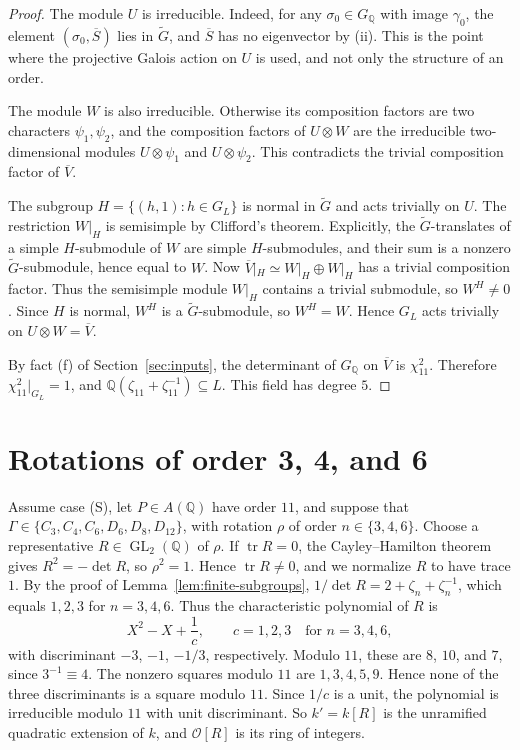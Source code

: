 \documentclass[11pt]{article}
\theoremstyle{remark}
\newcommand{\Q}{\mathbb Q}
\DeclareMathOperator{\GL}{GL}
\begin{document}
\begin{proof}
The module \(U\) is irreducible. Indeed, for any \(\sigma_0\in G_{\Q}\)
with image \(\gamma_0\), the element \((\sigma_0,\overline S)\) lies in
\(\widetilde G\), and \(\overline S\) has no eigenvector by (ii). This
is the point where the projective Galois action on \(U\) is used, and
not only the structure of an order.

The module \(W\) is also irreducible. Otherwise its composition factors
are two characters \(\psi_1,\psi_2\), and the composition factors of
\(U\otimes W\) are the irreducible two-dimensional modules
\(U\otimes\psi_1\) and \(U\otimes\psi_2\). This contradicts the trivial
composition factor of \(\overline V\).

The subgroup \(H=\{(h,1):h\in G_L\}\) is normal in \(\widetilde G\) and
acts trivially on \(U\). The restriction \(W|_H\) is semisimple by
Clifford's theorem. Explicitly, the \(\widetilde G\)-translates of a
simple \(H\)-submodule of \(W\) are simple \(H\)-submodules, and their
sum is a nonzero \(\widetilde G\)-submodule, hence equal to \(W\). Now
\(\overline V|_H\simeq W|_H\oplus W|_H\) has a trivial composition
factor. Thus the semisimple module \(W|_H\) contains a trivial
submodule, so \(W^H\neq0\). Since \(H\) is normal, \(W^H\) is a
\(\widetilde G\)-submodule, so \(W^H=W\). Hence \(G_L\) acts trivially
on \(U\otimes W=\overline V\).

By fact (f) of Section~\ref{sec:inputs}, the determinant of
\(G_{\Q}\) on \(\overline V\) is \(\chi_{11}^2\). Therefore
\(\chi_{11}^2|_{G_L}=1\), and
\(\Q(\zeta_{11}+\zeta_{11}^{-1})\subseteq L\). This field has degree
\(5\).
\end{proof}

\section{Rotations of order 3, 4, and 6}\label{sec:rotations}

Assume case (S), let \(P\in A(\Q)\) have order \(11\), and suppose
that \(\Gamma\in\{C_3,C_4,C_6,D_6,D_8,D_{12}\}\), with rotation
\(\rho\) of order \(n\in\{3,4,6\}\). Choose a representative
\(R\in\GL_2(\Q)\) of \(\rho\). If \(\operatorname{tr}R=0\), the
Cayley--Hamilton theorem gives \(R^2=-\det R\), so \(\rho^2=1\).
Hence \(\operatorname{tr}R\neq0\), and we normalize \(R\) to have trace
\(1\). By the proof of Lemma~\ref{lem:finite-subgroups},
\(1/\det R=2+\zeta_n+\zeta_n^{-1}\), which equals \(1,2,3\) for
\(n=3,4,6\). Thus the characteristic polynomial of \(R\) is
\[
 X^2-X+\frac1c,\qquad c=1,2,3\quad\text{for }n=3,4,6,
\]
with discriminant \(-3\), \(-1\), \(-1/3\), respectively. Modulo
\(11\), these are \(8\), \(10\), and \(7\), since \(3^{-1}\equiv4\).
The nonzero squares modulo \(11\) are \(1,3,4,5,9\). Hence none of the
three discriminants is a square modulo \(11\). Since \(1/c\) is a unit,
the polynomial is irreducible modulo \(11\) with unit discriminant. So
\(k'=k[R]\) is the unramified quadratic extension of \(k\), and
\(\mathcal O[R]\) is its ring of integers.
\end{document}
